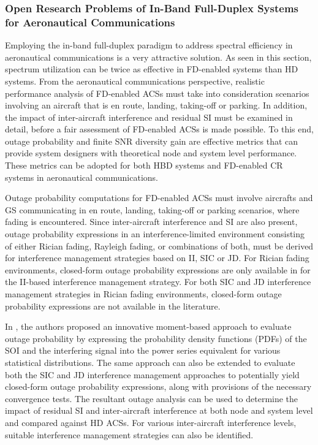\subsubsection{Open Research Problems of In-Band Full-Duplex Systems for Aeronautical Communications}

Employing the in-band full-duplex paradigm to address spectral efficiency in aeronautical communications is a very attractive solution. As seen in this section, spectrum utilization can be twice as effective in FD-enabled systems than HD systems. From the aeronautical communications perspective, realistic performance analysis of FD-enabled ACSs must take into consideration scenarios involving an aircraft that is en route, landing, taking-off or parking. In addition, the impact of inter-aircraft interference and residual SI must be examined in detail, before a fair assessment of FD-enabled ACSs is made possible. To this end, outage probability and finite SNR diversity gain are effective metrics that can provide system designers with theoretical node and system level performance. These metrics can be adopted for both HBD systems and FD-enabled CR systems in aeronautical communications.

Outage probability computations for FD-enabled ACSs must involve aircrafts and GS communicating in en route, landing, taking-off or parking scenarios, where fading is encountered. Since inter-aircraft interference and SI are also present, outage probability expressions in an interference-limited environment consisting of either Rician fading, Rayleigh fading, or combinations of both, must be derived for interference management strategies based on II, SIC or JD. For Rician fading environments, closed-form outage probability expressions are only available in \cite{rached2017unified} for the II-based interference management strategy. For both SIC and JD interference management strategies in Rician fading environments, closed-form outage probability expressions are not available in the literature. 

In \cite{rached2017unified}, the authors proposed an innovative moment-based approach to evaluate outage probability by expressing the probability density functions (PDFs) of the SOI and the interfering signal into the power series equivalent for various statistical distributions. The same approach can also be extended to evaluate both the SIC and JD interference management approaches to potentially yield closed-form outage probability expressions, along with provisions of the necessary convergence tests. The resultant outage analysis can be used to determine the impact of residual SI and inter-aircraft interference at both node and system level and compared against HD ACSs. For various inter-aircraft interference levels, suitable interference management strategies can also be identified.

